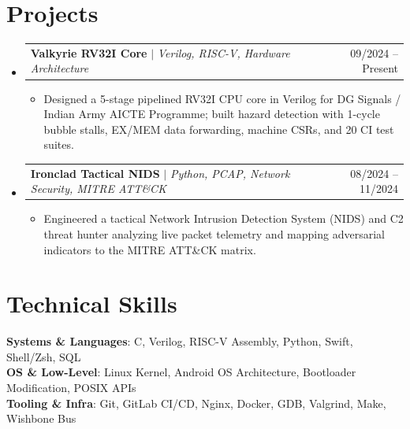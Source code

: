 \documentclass[letterpaper,10pt]{article}
\makeatletter
\newcommand{\resumeItem}[1]{\item\small{{#1 \vspace{-2pt}}}}
\newcommand{\resumeProjectHeading}[2]{
    \item
    \begin{tabular*}{0.97\textwidth}{l@{\extracolsep{\fill}}r}
      \small#1 & #2 \\
    \end{tabular*}\vspace{-7pt}
}
\newcommand{\resumeSubHeadingListStart}{\begin{itemize}[leftmargin=0.15in, label={}]}
\newcommand{\resumeSubHeadingListEnd}{\end{itemize}}
\newcommand{\resumeItemListStart}{\begin{itemize}}
\newcommand{\resumeItemListEnd}{\end{itemize}\vspace{-5pt}}
\makeatother
\begin{document}
\section{Projects}
  \resumeSubHeadingListStart
    \resumeProjectHeading
      {\textbf{Valkyrie RV32I Core} $|$ \emph{Verilog, RISC-V, Hardware Architecture}}{09/2024 -- Present}
      \resumeItemListStart
        \resumeItem{Designed a 5-stage pipelined RV32I CPU core in Verilog for DG Signals / Indian Army AICTE Programme; built hazard detection with 1-cycle bubble stalls, EX/MEM data forwarding, machine CSRs, and 20 CI test suites.}
      \resumeItemListEnd

    \resumeProjectHeading
      {\textbf{Ironclad Tactical NIDS} $|$ \emph{Python, PCAP, Network Security, MITRE ATT\&CK}}{08/2024 -- 11/2024}
      \resumeItemListStart
        \resumeItem{Engineered a tactical Network Intrusion Detection System (NIDS) and C2 threat hunter analyzing live packet telemetry and mapping adversarial indicators to the MITRE ATT\&CK matrix.}
      \resumeItemListEnd
  \resumeSubHeadingListEnd

\section{Technical Skills}
 \begin{itemize}[leftmargin=0.15in, label={}]
    \small{\item{
     \textbf{Systems \& Languages}{: C, Verilog, RISC-V Assembly, Python, Swift, Shell/Zsh, SQL} \\
     \textbf{OS \& Low-Level}{: Linux Kernel, Android OS Architecture, Bootloader Modification, POSIX APIs} \\
     \textbf{Tooling \& Infra}{: Git, GitLab CI/CD, Nginx, Docker, GDB, Valgrind, Make, Wishbone Bus} \\
    }}
 \end{itemize}
\end{document}
